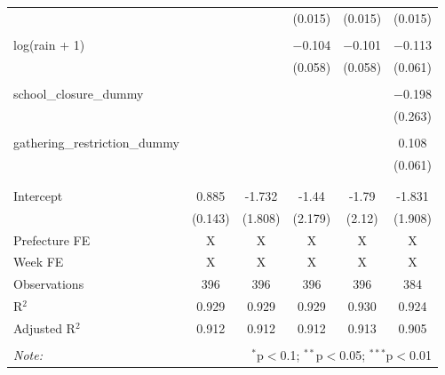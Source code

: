 \begin{table}[!htbp]
\begin{tabular}{@{\extracolsep{5pt}}lccccc}
  &  &  & (0.015) & (0.015) & (0.015) \\ 
  & & & & & \\ 
 log(rain + 1) &  &  & $-$0.104 & $-$0.101 & $-$0.113 \\ 
  &  &  & (0.058) & (0.058) & (0.061) \\ 
  & & & & & \\ 
 school\_closure\_dummy &  &  &  &  & $-$0.198 \\ 
  &  &  &  &  & (0.263) \\ 
  & & & & & \\ 
 gathering\_restriction\_dummy &  &  &  &  & 0.108 \\ 
  &  &  &  &  & (0.061) \\ 
  & & & & & \\ 
\hline \\[-1.8ex] 
Intercept & 0.885 & -1.732 & -1.44 & -1.79 & -1.831 \\ 
 & (0.143) & (1.808) & (2.179) & (2.12) & (1.908) \\ 
Prefecture FE & X & X & X & X & X \\ 
Week FE & X & X & X & X & X \\ 
Observations & 396 & 396 & 396 & 396 & 384 \\ 
R$^{2}$ & 0.929 & 0.929 & 0.929 & 0.930 & 0.924 \\ 
Adjusted R$^{2}$ & 0.912 & 0.912 & 0.912 & 0.913 & 0.905 \\ 
\hline 
\hline \\[-1.8ex] 
\textit{Note:}  & \multicolumn{5}{r}{$^{*}$p$<$0.1; $^{**}$p$<$0.05; $^{***}$p$<$0.01} \\ 
\end{tabular} 
\end{table} 
